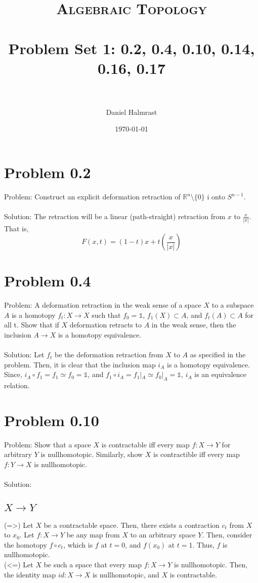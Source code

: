 \documentclass[paper=a4, fontsize=11pt]{scrartcl} %
\title{	
\normalfont \normalsize 
\textsc{Algebraic Topology} \\ [25pt] %
\horrule{0.5pt} \\[0.4cm] %
\huge Problem Set 1: 0.2, 0.4, 0.10, 0.14, 0.16, 0.17 \\ %
\horrule{2pt} \\[0.5cm] %
}
\author{Daniel Halmrast} %
\date{\normalsize\today} %
\numberwithin{equation}{section} %
\numberwithin{figure}{section} %
\numberwithin{table}{section} %
\begin{document}
\maketitle %


\section*{Problem 0.2}
Problem: Construct an explicit deformation retraction of $\mathbb{R}^n \setminus \{0\}$ i
onto $S^{n-1}$.
\\
\\
Solution: The retraction will be a linear (path-straight) retraction from $x$ to $\frac{x}{|x|}$. That is,
\[
F(x,t) = (1-t)x + t\left(\frac{x}{|x|}\right)
\]


\section*{Problem 0.4}
Problem: A deformation retraction in the weak sense of a space $X$ to a subspace $A$ is a homotopy
$f_t:X\to X$ such that $f_0 = \mathbb{1}$, $f_1(X) \subset A$, and $f_t(A) \subset A$ for all t.
Show that if $X$ deformation retracts to $A$ in the weak sense, then the inclusion $A \to X$
is a homotopy equivalence.
\\
\\
Solution: Let $f_t$ be the deformation retraction from $X$ to $A$ as specified in the problem.
Then, it is clear that the inclusion map $i_A$ is a homotopy equivalence. Since,
$i_A \circ f_1 = f_1 \simeq f_0 = \mathbb{1}$, and
$f_1 \circ i_A = f_1 |_A \simeq f_0|_A = \mathbb{1}$, $i_A$ is an equivalence relation.

\section*{Problem 0.10}
Problem: Show that a space $X$ is contractable iff every map $f:X\to Y$ for arbitrary $Y$ is
nullhomotopic. Similarly, show $X$ is contractible iff every map $f:Y \to X$ is nullhomotopic.
\\
\\
Solution:
\subsection*{$X\to Y$}
(=>) Let $X$ be a contractable space. Then, there exists a contraction $c_t$ from $X$ to $x_0$.
Let $f:X\to Y$ be any map from $X$ to an arbitrary space $Y$. Then, consider the homotopy
$f\circ c_t$, which is $f$ at $t=0$, and $f(x_0)$ at $t=1$. Thus, $f$ is nullhomotopic.
\\
(<=) Let $X$ be such a space that every map $f:X\to Y$ is nullhomotopic. Then, the identity
map $id:X\to X$ is nullhomotopic, and $X$ is contractable.
\end{document}
